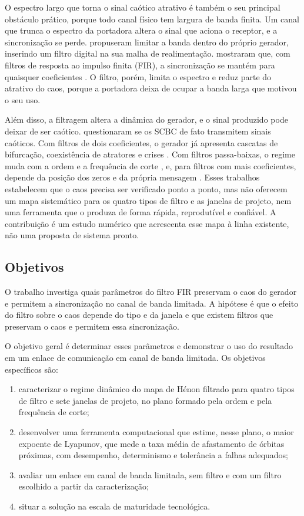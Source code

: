 \documentclass{pfccefsa}
\begin{document}
O espectro largo que torna o sinal caótico atrativo é também o seu principal
obstáculo prático, porque todo canal físico tem largura de banda finita. Um
canal que trunca o espectro da portadora altera o sinal que aciona o receptor,
e a sincronização se perde. \textcite{Eisencraft2009} propuseram limitar a banda dentro do próprio gerador,
inserindo um filtro digital na sua malha de realimentação. \textcite{Fontes2016}
mostraram que, com filtros de resposta ao impulso finita (FIR), a sincronização
se mantém para quaisquer coeficientes \cite{Fontes2017}. O filtro, porém, limita o espectro e reduz parte do atrativo do caos, porque a
portadora deixa de ocupar a banda larga que motivou o seu uso.

Além disso, a filtragem altera a dinâmica do gerador, e o sinal produzido pode
deixar de ser caótico. \textcite{Candido2015} questionaram se os SCBC de fato
transmitem sinais caóticos. Com filtros de dois coeficientes, o gerador já apresenta cascatas de bifurcação,
coexistência de atratores e crises \cite{Grebogi1983,BorgesCSF2022}. Com filtros passa-baixas,
o regime muda com a ordem e a frequência de corte
\cite{Borges2022sbrt,CNMAC2023}, e, para filtros com mais coeficientes, depende da
posição dos zeros \cite{BorgesCNSNS2024,BorgesTese2026} e da própria mensagem
\cite{Fontes2017,FontesSAI}. Esses trabalhos estabelecem que o caos precisa ser verificado ponto a ponto,
mas não oferecem um mapa sistemático para os quatro tipos de filtro e as janelas
de projeto, nem uma ferramenta que o produza de forma rápida, reprodutível e
confiável. A contribuição é um estudo numérico que acrescenta esse mapa à linha
existente, não uma proposta de sistema pronto.

\subsection{Objetivos}

O trabalho investiga quais parâmetros do filtro FIR preservam o caos do gerador
e permitem a sincronização no canal de banda limitada. A hipótese é que o efeito
do filtro sobre o caos depende do tipo e da janela e que existem filtros que
preservam o caos e permitem essa sincronização.

O objetivo geral é determinar esses parâmetros e demonstrar o uso do resultado
em um enlace de comunicação em canal de banda limitada. Os objetivos específicos são:
\begin{enumerate}
\item caracterizar o regime dinâmico do mapa de Hénon filtrado para quatro
tipos de filtro e sete janelas de projeto, no plano formado pela ordem e pela
frequência de corte;
\item desenvolver uma ferramenta computacional que estime, nesse plano, o maior
expoente de Lyapunov, que mede a taxa média de afastamento de órbitas próximas,
com desempenho, determinismo e tolerância a falhas adequados;
\item avaliar um enlace em canal de banda limitada, sem filtro e
com um filtro escolhido a partir da caracterização;
\item situar a solução na escala de maturidade tecnológica.
\end{enumerate}
\end{document}
